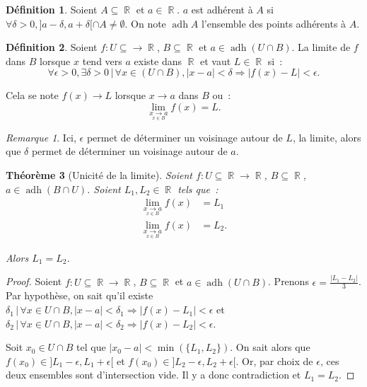 \documentclass{article}
\DeclareMathOperator{\R}{\mathbb R}
\DeclareMathOperator{\adh}{adh}
\newtheorem{thm}{Théorème}[section]
\theoremstyle{definition}
\newtheorem{déf}[thm]{Définition}
\theoremstyle{remark}
\newtheorem*{rmq}{Remarque}
\begin{document}
			\begin{déf} Soient $A \subseteq \R$ et $a \in \R$. $a$ est adhérent à $A$ si $\forall \delta > 0, ]a-\delta, a+\delta[ \cap A \neq \emptyset$.
			On note $\adh A$ l'ensemble des points adhérents à $A$. \end{déf}

			\begin{déf} Soient $f : U \subseteq \to \R$, $B \subseteq \R$ et $a \in \adh(U \cap B)$. La limite de $f$ dans $B$ lorsque
			$x$ tend vers $a$ existe dans $\R$ et vaut $L \in \R$ si~:
			\[\forall \epsilon > 0, \exists \delta > 0 \, | \, \forall x \in (U \cap B), |x-a| < \delta \Rightarrow |f(x)-L| < \epsilon.\]

			Cela se note $f(x) \to L$ lorsque $x \to a$ dans $B$ ou~:
			\[\lim_{\underset{x \in B}{x \to a}} f(x) = L.\]
			\end{déf}

			\begin{rmq} Ici, $\epsilon$ permet de déterminer un voisinage autour de $L$, la limite, alors que $\delta$ permet de déterminer un voisinage autour
			de $a$. \end{rmq}

			\begin{thm}[Unicité de la limite] Soient $f : U \subseteq \R \to \R$, $B \subseteq \R$, $a \in \adh(B \cap U)$. Soient $L_1, L_2 \in \R$ tels que~:
			\[\begin{aligned}
				\lim_{\underset{x \in B}{x \to a}} f(x) &= L_1 \\
				\lim_{\underset{x \in B}{x \to a}} f(x) &= L_2.
			\end{aligned}\]

			Alors $L_1 = L_2$. \end{thm}

			\begin{proof} Soient $f : U \subseteq \R \to \R$, $B \subseteq \R$ et $a \in \adh(U \cap B)$. Prenons $\epsilon = \frac {|L_1 - L_2|}3$.
			Par hypothèse, on sait qu'il existe $\delta_1 \, | \, \forall x \in U \cap B, |x-a| < \delta_1 \Rightarrow |f(x) - L_1| < \epsilon$ et
			$\delta_2 \, | \, \forall x \in U \cap B, |x-a| < \delta_2 \Rightarrow |f(x) - L_2| < \epsilon$.

			Soit $x_0 \in U \cap B$ tel que $|x_0 - a| < \min(\{L_1, L_2\})$. On sait alors que
			$f(x_0) \in ]L_1-\epsilon, L_1+\epsilon[$ et $f(x_0) \in ]L_2-\epsilon, L_2+\epsilon[$.
			Or, par choix de $\epsilon$, ces deux ensembles sont d'intersection vide. Il y a donc contradiction et $L_1 = L_2$. \end{proof}
\end{document}
